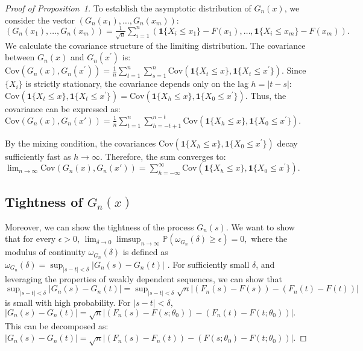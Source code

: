 \documentclass[12pt]{article}
\begin{document}
\begin{proof}[Proof of Proposition~1]
To establish the asymptotic distribution of $ G_n(x) $, we consider the vector 
$ (G_n(x_1), \ldots, G_n(x_m)) $:
$
(G_n(x_1), \ldots, G_n(x_m)) = \frac{1}{\sqrt{n}} \sum_{i=1}^n (\mathbf{1}\{X_i \leq x_1\} - 
F(x_1), \ldots, \mathbf{1}\{X_i \leq x_m\} - F(x_m)).
$
We calculate the covariance structure of the limiting distribution. The 
covariance between $ G_n(x) $ and $ G_n(x^{\prime}) $ is:
$
\text{Cov}(G_n(x), G_n(x^{\prime})) = \frac{1}{n} \sum_{t=1}^n \sum_{s=1}^n 
\text{Cov}(\mathbf{1}\{X_t \leq x\}, \mathbf{1}\{X_t \leq x^{\prime}\}).
$
Since $ \{X_i\} $ is strictly stationary, the covariance depends only on the 
lag $ h = |t-s| $:
$
\text{Cov}(\mathbf{1}\{X_t \leq x\}, \mathbf{1}\{X_t \leq x^{\prime}\}) = \text{Cov}(\mathbf{1}\{X_h \leq x\}, 
\mathbf{1}\{X_0 \leq x^{\prime}\}).
$
Thus, the covariance can be expressed as:
$
\text{Cov}(G_n(x), G_n(x')) = \frac{1}{n} \sum_{t=1}^n \sum_{h=-t+1}^{n-t} 
\text{Cov}(\mathbf{1}\{X_h \leq x\}, 
\mathbf{1}\{X_0 \leq x^{\prime}\}).
$

By the mixing condition, the covariances $ \text{Cov}(\mathbf{1}\{X_h \leq x\}, 
\mathbf{1}\{X_0 \leq x^{\prime}\}) $ 
decay sufficiently fast as $ h \to \infty $. Therefore, the sum converges to:
$
\lim_{n \to \infty} \text{Cov}(G_n(x), G_n(x')) = \sum_{h=-\infty}^{\infty} 
\text{Cov}(\mathbf{1}\{X_h \leq x\}, 
\mathbf{1}\{X_0 \leq x^{\prime}\}).
$


\subsection{Tightness of $G_n(x)$}

Moreover, we can show the tightness of the process $G_n(s)$. 
We want to show that for every $\epsilon > 0$,
$
\lim_{\delta \to 0} \limsup_{n \to \infty} \mathbb{P}\left( \omega_{G_n}(\delta) 
\geq \epsilon \right) = 0,
$
where the modulus of continuity $\omega_{G_n}(\delta)$ is defined as
$
\omega_{G_n}(\delta) = \sup_{|s - t| < \delta} |G_n(s) - G_n(t)|
$
\citep{billingsley2013convergence}.
For sufficiently small $\delta$, and leveraging the properties of weakly 
dependent sequences, we can show that
$ \sup_{|s - t| < \delta} |G_n(s) - G_n(t)| = \sup_{|s - t| < \delta} 
\sqrt{n}|(F_n(s) - F(s)) - (F_n(t) - F(t))| $
is small with high probability.
For $ |s - t| < \delta $,
$
|G_n(s) - G_n(t)| = \sqrt{n} \left| (F_n(s) - F(s; \theta_0)) - (F_n(t) - 
F(t; \theta_0)) \right|.
$
This can be decomposed as:
$
|G_n(s) - G_n(t)| = \sqrt{n} \left| (F_n(s) - F_n(t)) - (F(s; \theta_0) - 
F(t; \theta_0)) \right|.
$


\end{proof}
\end{document}
